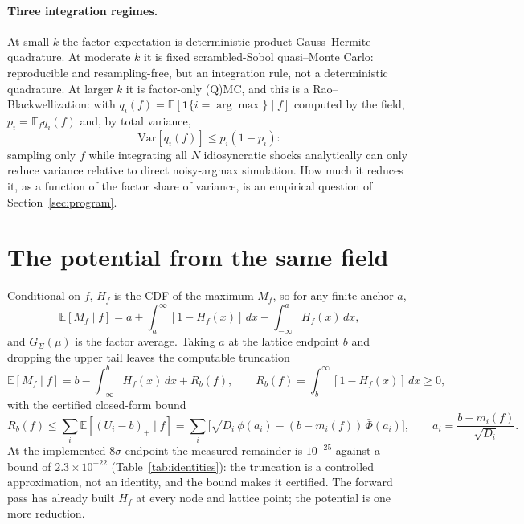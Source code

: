 \documentclass[11pt]{article}
\theoremstyle{remark}
\newcommand{\E}{\mathbb{E}}
\begin{document}
\paragraph{Three integration regimes.} At small $k$ the factor
expectation is deterministic product Gauss--Hermite quadrature. At
moderate $k$ it is fixed scrambled-Sobol quasi--Monte Carlo:
reproducible and resampling-free, but an integration rule, not a
deterministic quadrature. At larger $k$ it is factor-only (Q)MC, and
this is a Rao--Blackwellization: with $q_i(f) = \E[\mathbf{1}\{i =
\arg\max\} \mid f]$ computed by the field,
$p_i = \E_f q_i(f)$ and, by total variance,
\[
\mathrm{Var}[q_i(f)] \le p_i(1 - p_i):
\]
sampling only $f$ while integrating all $N$ idiosyncratic shocks
analytically can only reduce variance relative to direct noisy-argmax
simulation. How much it reduces it, as a function of the factor share
of variance, is an empirical question of Section~\ref{sec:program}.

\section{The potential from the same field}\label{sec:potential}

Conditional on $f$, $H_f$ is the CDF of the maximum $M_f$, so for any
finite anchor $a$,
\[
\E[M_f \mid f] = a + \int_a^{\infty} [1 - H_f(x)]\, dx
- \int_{-\infty}^{a} H_f(x)\, dx ,
\]
and $G_\Sigma(\mu)$ is the factor average. Taking $a$ at the lattice
endpoint $b$ and dropping the upper tail leaves the computable truncation
\[
\E[M_f \mid f] = b - \int_{-\infty}^{b} H_f(x)\, dx + R_b(f), \qquad
R_b(f) = \int_b^\infty [1 - H_f(x)]\, dx \ge 0,
\]
with the certified closed-form bound
\[
R_b(f) \le \sum_i \E[(U_i - b)_+ \mid f]
= \sum_i \Big[ \sqrt{D_i}\,\phi(a_i) - (b - m_i(f))\,\bar\Phi(a_i)
\Big], \qquad a_i = \frac{b - m_i(f)}{\sqrt{D_i}} .
\]
At the implemented $8\sigma$ endpoint the measured remainder is
$10^{-25}$ against a bound of $2.3\times10^{-22}$
(Table~\ref{tab:identities}): the truncation is a controlled
approximation, not an identity, and the bound makes it certified. The
forward pass has already built $H_f$ at every node and lattice point;
the potential is one more reduction.
\end{document}
